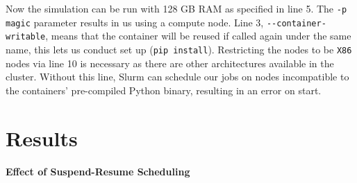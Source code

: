 Now the simulation can be run with 128 GB RAM as specified in line 5. 
The \verb|-p magic| parameter results in us using a compute node. 
Line 3, \verb|--container-writable|, means that the container will be reused if called again under the same name, this lets us conduct set up  (\verb|pip install|).
Restricting the nodes to be \verb|X86| nodes via line 10 is necessary as there are other architectures available in the cluster. 
Without this line, Slurm can schedule our jobs on nodes incompatible to the containers' pre-compiled Python binary, resulting in an error on start.

\section{Results}

\paragraph{Effect of Suspend-Resume Scheduling}

